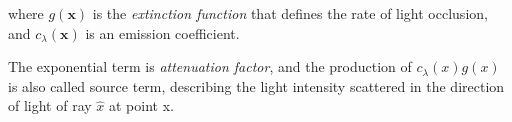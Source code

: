 

where $g(\mathbf{x})$ is the \textit{extinction function} that defines the rate of light occlusion, 
and $c_\lambda(\mathbf{x})$ is an emission coefficient.

The exponential term is \textit{attenuation factor}, and the production of $c_\lambda(x)g(x)$ is also called source term, describing the light intensity scattered in the direction of light of ray 
$\hat{x}$ at point x.

